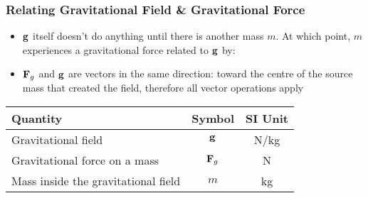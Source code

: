 \documentclass[12pt,compress,aspectratio=169]{beamer}
\newcommand{\mb}[1]{\ensuremath\mathbf{#1}}
\begin{document}
\begin{frame}
  \frametitle{Relating Gravitational Field \& Gravitational Force}
  \begin{itemize}
  \item $\mb{g}$ itself doesn't do anything until there is another mass $m$.
    At which point, $m$ experiences a gravitational force  related to $\mb{g}$
    by:

    \vspace{-0.2in}{\Large
      \begin{displaymath}
        \boxed{\mb{g}=\frac{\mb{F}_g}{m}}
      \end{displaymath}
    }
  \item $\mb{F}_g$ and  $\mb{g}$ are vectors in the same direction: toward the
    centre of the source mass that created the field, therefore all vector
    operations apply
  \end{itemize}

  \begin{center}
    \begin{tabular}{l|c|c}
      \rowcolor{pink}
      \textbf{Quantity} & \textbf{Symbol} & \textbf{SI Unit} \\ \hline
      Gravitational field & $\mb{g}$   & \si{N/kg}\\
      Gravitational force on a mass & $\mb{F}_g$ & \si{N} \\
      Mass inside the gravitational field & $m$ & \si{kg} \\
    \end{tabular}
  \end{center}
\end{frame}
\end{document}
